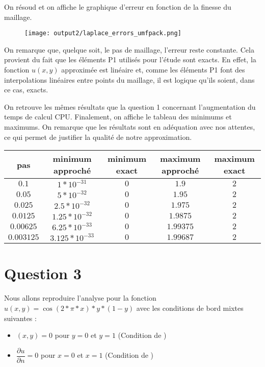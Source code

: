\documentclass[11pt,a4paper]{report}
\begin{document}
			On résoud et on affiche le graphique d'erreur en fonction de la finesse du maillage. 
			
			\begin{figure}[H]
				\centering
				\texttt{[image: output2/laplace\_errors\_umfpack.png]}
			\end{figure}
	
			On remarque que, quelque soit, le pas de maillage, l'erreur reste constante. Cela provient du fait que les éléments P1 utilisés pour l'étude sont exacts. En effet, la fonction $u(x,y)$ approximée est linéaire et, comme les éléments P1 font des interpolations linéaires entre points du maillage, il est logique qu'ils soient, dans ce cas, exacts.
			
			On retrouve les mêmes résultats que la question 1 concernant l'augmentation du temps de calcul CPU. Finalement, on affiche le tableau des minimums et maximums. On remarque que les résultats sont en adéquation avec nos attentes, ce qui permet de justifier la qualité de notre approximation.
					
			\begin{center}
				\begin{tabular}{|c|c|c|c|c|}
					\hline
					pas & minimum approché & minimum exact & maximum approché & maximum exact \\
					\hline 
					$0.1$ & $1*10^{-31}$ & $0$ & $1.9$ & $2$\\ 
					\hline 
					$0.05$ & $5*10^{-32}$ & $0$ & $1.95$ & $2$\\ 
					\hline 
					$0.025$ & $2.5*10^{-32}$ & $0$ & $1.975$ & $2$  \\ 
					\hline 
					$0.0125$ & $1.25*10^{-32}$ & $0$ & $1.9875$ & $2$\\ 
					\hline 
					$0.00625$ & $6.25*10^{-33}$ & $0$ & $1.99375$ & $2$ \\ 
					\hline 
					$0.003125$ & $3.125*10^{-33}$ & $0$ & $1.99687$ & $2$ \\ 
					\hline 
				\end{tabular} 
			\end{center}
	
		

		\section*{Question 3}
			
			Nous allons reproduire l'analyse pour la fonction $u(x,y) = \cos(2*\pi*x)*y*(1-y)$ avec les conditions de bord mixtes suivantes : 
			\begin{itemize}
				\item $(x,y) = 0$ pour ${y = 0}$ et ${y = 1}$ (Condition de )
				\item $\dfrac{\partial u }{\partial n} = 0$ pour ${x = 0}$ et ${x = 1}$ (Condition de )
			\end{itemize}
		
\end{document}
